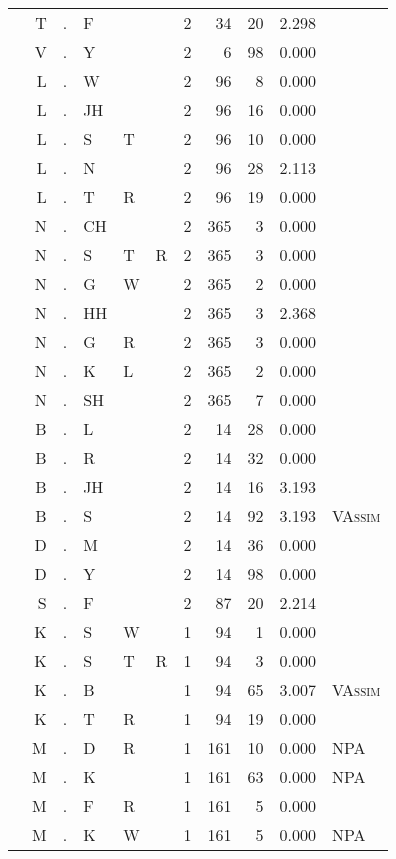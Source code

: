 \begin{longtable}{r@{ } r@{ } c@{ } l@{ } l@{ } l@{ } r r r r l }
 & T & . & F &  &  & 2 & 34 & 20 & 2.298 &  \\
 & V & . & Y &  &  & 2 & 6 & 98 & 0.000 &  \\
 & L & . & W &  &  & 2 & 96 & 8 & 0.000 &  \\
 & L & . & JH &  &  & 2 & 96 & 16 & 0.000 &  \\
 & L & . & S & T &  & 2 & 96 & 10 & 0.000 &  \\
 & L & . & N &  &  & 2 & 96 & 28 & 2.113 &  \\
 & L & . & T & R &  & 2 & 96 & 19 & 0.000 &  \\
 & N & . & CH &  &  & 2 & 365 & 3 & 0.000 &  \\
 & N & . & S & T & R & 2 & 365 & 3 & 0.000 &  \\
 & N & . & G & W &  & 2 & 365 & 2 & 0.000 &  \\
 & N & . & HH &  &  & 2 & 365 & 3 & 2.368 &  \\
 & N & . & G & R &  & 2 & 365 & 3 & 0.000 &  \\
 & N & . & K & L &  & 2 & 365 & 2 & 0.000 &  \\
 & N & . & SH &  &  & 2 & 365 & 7 & 0.000 &  \\
 & B & . & L &  &  & 2 & 14 & 28 & 0.000 &  \\
 & B & . & R &  &  & 2 & 14 & 32 & 0.000 &  \\
 & B & . & JH &  &  & 2 & 14 & 16 & 3.193 &  \\
 & B & . & S &  &  & 2 & 14 & 92 & 3.193 & \textsc{VAssim} \\
 & D & . & M &  &  & 2 & 14 & 36 & 0.000 &  \\
 & D & . & Y &  &  & 2 & 14 & 98 & 0.000 &  \\
 & S & . & F &  &  & 2 & 87 & 20 & 2.214 &  \\
 & K & . & S & W &  & 1 & 94 & 1 & 0.000 &  \\
 & K & . & S & T & R & 1 & 94 & 3 & 0.000 &  \\
 & K & . & B &  &  & 1 & 94 & 65 & 3.007 & \textsc{VAssim} \\
 & K & . & T & R &  & 1 & 94 & 19 & 0.000 &  \\
 & M & . & D & R &  & 1 & 161 & 10 & 0.000 & \textsc{NPA} \\
 & M & . & K &  &  & 1 & 161 & 63 & 0.000 & \textsc{NPA} \\
 & M & . & F & R &  & 1 & 161 & 5 & 0.000 &  \\
 & M & . & K & W &  & 1 & 161 & 5 & 0.000 & \textsc{NPA} \\

\end{longtable}
